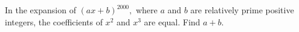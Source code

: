 In the expansion of $(ax+b)^{2000},$ where $a$ and $b$ are relatively prime positive integers, the coefficients of $x^{2}$ and $x^{3}$ are equal. Find $a+b.$
